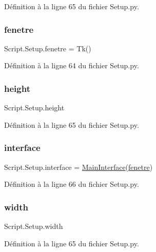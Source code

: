Définition à la ligne 65 du fichier Setup.\+py.

\mbox{\label{namespaceScript_1_1Setup_a29d68f31a39926032c0d32fe3ea0c4eb}} 
\subsubsection{\texorpdfstring{fenetre}{fenetre}}
{\footnotesize\ttfamily Script.\+Setup.\+fenetre = Tk()}



Définition à la ligne 64 du fichier Setup.\+py.

\mbox{\label{namespaceScript_1_1Setup_a334aa187cc8c0b7354d8f6b33894d575}} 
\subsubsection{\texorpdfstring{height}{height}}
{\footnotesize\ttfamily Script.\+Setup.\+height}



Définition à la ligne 65 du fichier Setup.\+py.

\mbox{\label{namespaceScript_1_1Setup_a11f256776bccf507b8e83363360c8ff7}} 
\subsubsection{\texorpdfstring{interface}{interface}}
{\footnotesize\ttfamily Script.\+Setup.\+interface = \hyperlink{classScript_1_1Setup_1_1MainInterface}{Main\+Interface}(\hyperlink{namespaceScript_1_1Setup_a29d68f31a39926032c0d32fe3ea0c4eb}{fenetre})}



Définition à la ligne 66 du fichier Setup.\+py.

\mbox{\label{namespaceScript_1_1Setup_a430ab18615fdd48075635baef7ed6832}} 
\subsubsection{\texorpdfstring{width}{width}}
{\footnotesize\ttfamily Script.\+Setup.\+width}



Définition à la ligne 65 du fichier Setup.\+py.

